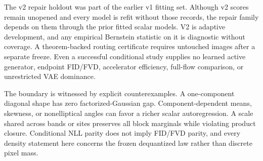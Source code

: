 \documentclass[11pt]{article}
\begin{document}
The v2 repair holdout was part of the earlier v1 fitting set.  Although v2 scores remain unopened and every model is refit without those records, the repair family depends on them through the prior fitted scalar models.  V2 is adaptive development, and any empirical Bernstein statistic on it is diagnostic without coverage.  A theorem-backed routing certificate requires untouched images after a separate freeze.  Even a successful conditional study supplies no learned active generator, endpoint FID/FVD, accelerator efficiency, full-flow comparison, or unrestricted VAE dominance.

The boundary is witnessed by explicit counterexamples.  A one-component diagonal shape has zero factorized-Gaussian gap.  Component-dependent means, skewness, or nonelliptical angles can favor a richer scalar autoregression.  A scale shared across bands or sites preserves all block marginals while violating product closure.  Conditional NLL parity does not imply FID/FVD parity, and every density statement here concerns the frozen dequantized law rather than discrete pixel mass.
\end{document}
